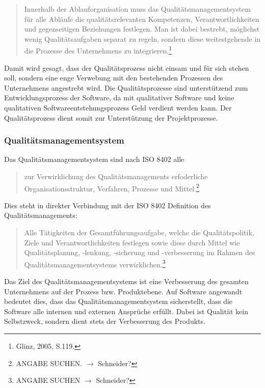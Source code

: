                 \begin{quote}
                  Innerhalb der Ablauforganisation muss das Qualitätsmanagementsystem für alle Abläufe die qualitätsrelevanten Kompetenzen, Verantwortlichkeiten und gegenseitigen Beziehungen festlegen. Man ist dabei bestrebt, möglichst wenig Qualitätsaufgaben separat zu regeln, sondern diese weitestgehende in die Prozesse des Unternehmens zu integrieren.\footnote{Glinz, 2005, S.119.}
                \end{quote}

                Damit wird gesagt, dass der Qualitätsprozess nicht einsam und für sich stehen soll, sondern eine enge Verwebung mit den bestehenden Prozessen des Unternehmens angestrebt wird. Die Qualitätsprozesse sind unterstützend zum Entwicklungsprozess der Software, da mit qualitativer Software und keine qualitativen Softwareentstehungsprozess Geld verdient werden kann. Der Qualitätsprozess dient somit zur Unterstützung der Projektprozesse.

            \subsubsection{Qualitätsmanagementsystem}

                Das Qualitätsmanagementsystem sind nach ISO 8402 alle
                \begin{quote}
                    zur Verwirklichung des Qualitätsmanagements erfoderliche Organisationsstruktur, Verfahren, Prozesse und Mittel.\footnote{ANGABE SUCHEN. $\rightarrow$ Schneider?}
                \end{quote}
                Dies steht in direkter Verbindung mit der ISO 8402 Definition des Qualitätsmanagements: \begin{quote}
                    Alle Tätigkeiten der Gesamtführungsaufgabe, welche die Qualitätspolitik, Ziele und Verantwortlichkeiten festlegen sowie diese durch Mittel wie Qualitätsplanung, -lenkung, -sicherung und -verbesserung im Rahmen des Qualitätsmanagementsystems verwirklichen.\footnote{ANGABE SUCHEN $\rightarrow$ Schneider?}
                \end{quote}

                Das Ziel des Qualitätsmanagementsystems ist eine Verbesserung des gesamten Unternehmens auf der Prozess bzw. Produktebene. Auf Software angewandt bedeutet dies, dass das Qualitätsmanagementsystem sicherstellt, dass die Software alle internen und externen Ansprüche erfüllt. Dabei ist Qualität kein Selbstzweck, sondern dient stets der Verbesserung des Produkts.

